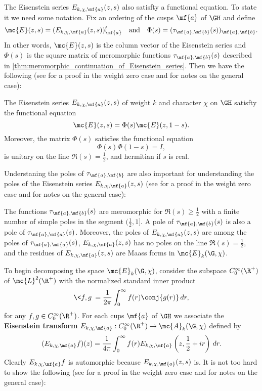     The Eisenstein series $E_{k,\chi,\mf{a}}(z,s)$ also satisfty a functional equation. To state it we need some notation. Fix an ordering of the cusps $\mf{a}$ of $\GH$ and define
    \[
      \mc{E}(z,s) = (E_{k,\chi,\mf{a}}(z,s))_{\mf{a}}^{t} \quad \text{and} \quad \Phi(s) = (\tau_{\mf{a},\mf{b}}(s))_{\mf{a},\mf{b}}.
    \]
    In other words, $\mc{E}(z,s)$ is the column vector of the Eisenstein series and $\Phi(s)$ is the square matrix of meromorphic functions $\tau_{\mf{a},\mf{b}}(s)$ described in \cref{thm:meromorphic_continuation_of_Eisenstein_series}. Then we have the following (see \cite{iwaniec2002spectral} for a proof in the weight zero case and \cite{cohenmodular2017} for notes on the general case): 

    \begin{theorem}\label{thm:functional_equation_of_Eisenstein_series}
      The Eisenstein series $E_{k,\chi,\mf{a}}(z,s)$ of weight $k$ and character $\chi$ on $\GH$ satisfty the functional equation 
      \[
        \mc{E}(z,s) = \Phi(s)\mc{E}(z,1-s).
      \]
      Moreover, the matrix $\Phi(s)$ satisfies the functional equation
      \[
        \Phi(s)\Phi(1-s) = I,
      \]
      is unitary on the line $\Re(s) = \frac{1}{2}$, and hermitian if $s$ is real.
    \end{theorem}

    Understaning the poles of $\tau_{\mf{a},\mf{b}}$ are also important for understanding the poles of the Eisenstein series $E_{k,\chi,\mf{a}}(z,s)$ (see \cite{iwaniec2002spectral} for a proof in the weight zero case and \cite{cohenmodular2017} for notes on the general case):

    \begin{theorem}\label{thm:residues_of_Eisenstein_series}
      The functions $\tau_{\mf{a},\mf{b}}(s)$ are meromorphic for $\Re(s) \ge \frac{1}{2}$ with a finite number of simple poles in the segment $(\frac{1}{2},1]$. A pole of $\tau_{\mf{a},\mf{b}}(s)$ is also a pole of $\tau_{\mf{a},\mf{a}}(s)$. Moreover, the poles of $E_{k,\chi,\mf{a}}(z,s)$ are among the poles of $\tau_{\mf{a},\mf{a}}(s)$, $E_{k,\chi,\mf{a}}(z,s)$ has no poles on the line $\Re(s) = \frac{1}{2}$, and the residues of $E_{k,\chi,\mf{a}}(z,s)$ are Maass forms in $\mc{E}_{k}(\G,\chi)$.
    \end{theorem}

    To begin decomposing the space $\mc{E}_{k}(\G,\chi)$, consider the subspace $C_{0}^{\infty}(\R^{+})$ of $\mc{L}^{2}(\R^{+})$ with the normalized standard inner product
    \[
      \<f,g\> = \frac{1}{2\pi}\int_{0}^{\infty}f(r)\conj{g(r)}\,dr,
    \]
    for any $f,g \in C_{0}^{\infty}(\R^{+})$. For each cups $\mf{a}$ of $\GH$ we associate the \textbf{Eisenstein transform} $E_{k,\chi,\mf{a}}:C_{0}^{\infty}(\R^{+}) \to \mc{A}_{k}(\G,\chi)$ defined by
    \[
      (E_{k,\chi,\mf{a}}f)(z) = \frac{1}{4\pi}\int_{0}^{\infty}f(r)E_{k,\chi,\mf{a}}\left(z,\frac{1}{2}+ir\right)\,dr.
    \]
    Clearly $E_{k,\chi,\mf{a}}f$ is automorphic because $E_{k,\chi,\mf{a}}(z,s)$ is. It is not too hard to show the following (see \cite{iwaniec2002spectral} for a proof in the weight zero case and \cite{cohenmodular2017} for notes on the general case):

